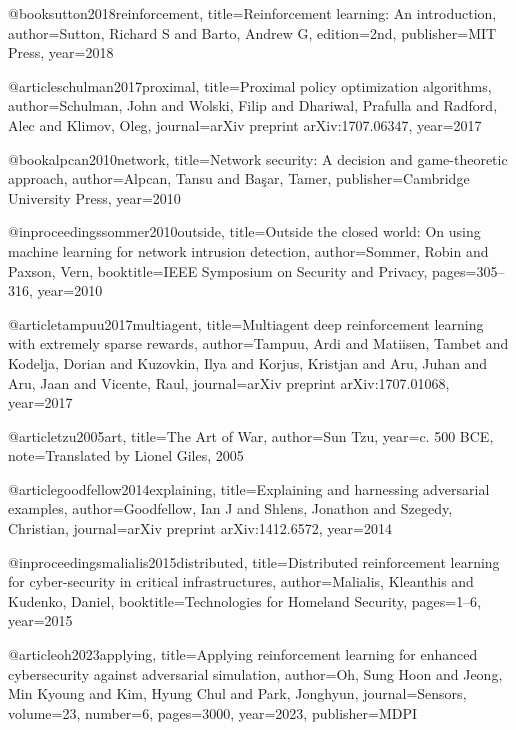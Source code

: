 
@book{sutton2018reinforcement,
  title={Reinforcement learning: An introduction},
  author={Sutton, Richard S and Barto, Andrew G},
  edition={2nd},
  publisher={MIT Press},
  year={2018}
}

@article{schulman2017proximal,
  title={Proximal policy optimization algorithms},
  author={Schulman, John and Wolski, Filip and Dhariwal, Prafulla and Radford, Alec and Klimov, Oleg},
  journal={arXiv preprint arXiv:1707.06347},
  year={2017}
}

@book{alpcan2010network,
  title={Network security: A decision and game-theoretic approach},
  author={Alpcan, Tansu and Ba{\c{s}}ar, Tamer},
  publisher={Cambridge University Press},
  year={2010}
}

@inproceedings{sommer2010outside,
  title={Outside the closed world: On using machine learning for network intrusion detection},
  author={Sommer, Robin and Paxson, Vern},
  booktitle={IEEE Symposium on Security and Privacy},
  pages={305--316},
  year={2010}
}

@article{tampuu2017multiagent,
  title={Multiagent deep reinforcement learning with extremely sparse rewards},
  author={Tampuu, Ardi and Matiisen, Tambet and Kodelja, Dorian and Kuzovkin, Ilya and Korjus, Kristjan and Aru, Juhan and Aru, Jaan and Vicente, Raul},
  journal={arXiv preprint arXiv:1707.01068},
  year={2017}
}

@article{tzu2005art,
  title={The Art of War},
  author={Sun Tzu},
  year={c. 500 BCE},
  note={Translated by Lionel Giles, 2005}
}

@article{goodfellow2014explaining,
  title={Explaining and harnessing adversarial examples},
  author={Goodfellow, Ian J and Shlens, Jonathon and Szegedy, Christian},
  journal={arXiv preprint arXiv:1412.6572},
  year={2014}
}

@inproceedings{malialis2015distributed,
  title={Distributed reinforcement learning for cyber-security in critical infrastructures},
  author={Malialis, Kleanthis and Kudenko, Daniel},
  booktitle={Technologies for Homeland Security},
  pages={1--6},
  year={2015}
}

@article{oh2023applying,
  title={Applying reinforcement learning for enhanced cybersecurity against adversarial simulation},
  author={Oh, Sung Hoon and Jeong, Min Kyoung and Kim, Hyung Chul and Park, Jonghyun},
  journal={Sensors},
  volume={23},
  number={6},
  pages={3000},
  year={2023},
  publisher={MDPI}
}

